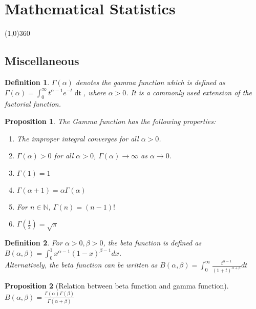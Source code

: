 \documentclass[14pt,twoside]{extreport}
\theoremstyle{dotless}
\newtheorem*{defn}{Definition}
\newtheorem*{prop}{Proposition} %
\begin{document}
\newpage
{}

\chapter*{Mathematical Statistics}
\line(1,0){360} \\

\section*{Miscellaneous}

\begin{defn}
    $\Gamma(\alpha)$ denotes the gamma function which is defined as $\Gamma(\alpha) = \displaystyle\int_0^\infty t ^{\alpha - 1} e ^{-t} \mathop{\mathrm{d} t}$, where $\alpha > 0$. It is a commonly used extension of the factorial function.
\end{defn}

\begin{prop}
    The Gamma function has the following properties:
    \begin{enumerate}
        \item The improper integral converges for all $\alpha > 0$.
        \item $\Gamma(\alpha) > 0$  for all $\alpha > 0$, $\Gamma(\alpha) \to \infty$ as $\alpha \to 0$.
        \item $\Gamma(1) = 1$
        \item $\Gamma(\alpha + 1) = \alpha \Gamma(\alpha)$
        \item For $n \in \mathbb{N}$, $\Gamma(n) = (n-1)!$
        \item $\Gamma(\frac{1}{2}) = \sqrt{\pi}$
    \end{enumerate}
\end{prop}

\begin{defn}
    For $\alpha > 0, \beta > 0$, the beta function is defined as $B(\alpha, \beta) = \displaystyle\int_0^1 x^{\alpha -1} (1-x)^{\beta - 1} dx$.
    \\

    Alternatively, the beta function can be written as $B(\alpha, \beta) = \displaystyle\int_0^\infty \frac{t^{\alpha - 1}}{(1+t)^{\alpha + \beta}} dt$
\end{defn}

\begin{prop}[Relation between beta function and gamma function]\ \\
    $B(\alpha, \beta) = \displaystyle\frac{\Gamma(\alpha)\Gamma(\beta)}{\Gamma(\alpha + \beta)}$
\end{prop}
\end{document}
